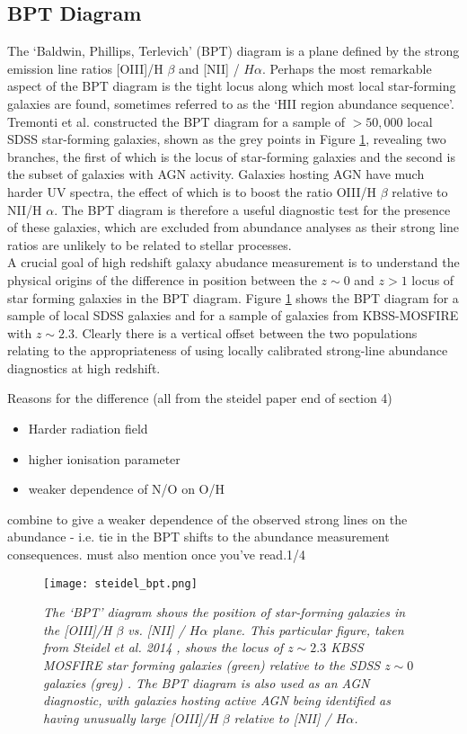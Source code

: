 \documentclass{literature}
\begin{document}
\subsection{BPT Diagram}
The `Baldwin, Phillips, Terlevich' (BPT) diagram is a plane defined by the strong emission line ratios [OIII]/H $\beta$ and [NII] / $H\alpha$. Perhaps the most remarkable aspect of the BPT diagram is the tight locus along which most local star-forming galaxies are found, sometimes referred to as the `HII region abundance sequence'. Tremonti et al. constructed the BPT diagram for a sample of $> 50,000$ local SDSS star-forming galaxies, shown as the grey points in Figure \ref{fig:steidel_bpt}, revealing two branches, the first of which is the locus of star-forming galaxies and the second is the subset of galaxies with AGN activity. Galaxies hosting AGN have much harder UV spectra, the effect of which is to boost the ratio OIII/H $\beta$ relative to NII/H $\alpha$. The BPT diagram is therefore a useful diagnostic test for the presence of these galaxies, which are excluded from abundance analyses as their strong line ratios are unlikely to be related to stellar processes. \\ 


A crucial goal of high redshift galaxy abudance measurement is to understand the physical origins of the difference in position between the $z \sim 0$ and $z > 1$ locus of star forming galaxies in the BPT diagram. Figure \ref{fig:steidel_bpt} shows the BPT diagram for a sample of local SDSS galaxies \citep{Tremonti2004} and for a sample of galaxies from KBSS-MOSFIRE with $z \sim 2.3$. Clearly there is a vertical offset between the two populations  
relating to the appropriateness of using locally calibrated strong-line abundance diagnostics at high redshift. 

Reasons for the difference (all from the steidel paper end of section 4)
\begin{itemize}
	\item Harder radiation field 
	\item higher ionisation parameter 
	\item weaker dependence of N/O on O/H
\end{itemize}
combine to give a weaker dependence of the observed strong lines on the abundance - i.e. tie in the BPT shifts to the abundance measurement consequences. 
must also mention \citep{Kewley2013} once you've read.1/4

\begin{figure}[!htp]
\centering
\texttt{[image: steidel\_bpt.png]}
\caption{\footnotesize{\emph{The `BPT' diagram shows the position of star-forming galaxies in the [OIII]/H $\beta$ vs. [NII] / $H\alpha$ plane. This particular figure, taken from Steidel et al. 2014 \citep{Steidel2014}, shows the locus of $z \sim 2.3$ KBSS MOSFIRE star forming galaxies (green) relative to the SDSS $z \sim 0$ galaxies (grey) \citep{Tremonti2004}. The BPT diagram is also used as an AGN diagnostic, with galaxies hosting active AGN being identified as having unusually large [OIII]/H $\beta$ relative to [NII] / $H\alpha$.}}}
\label{fig:steidel_bpt}
\end{figure} 
\end{document}
